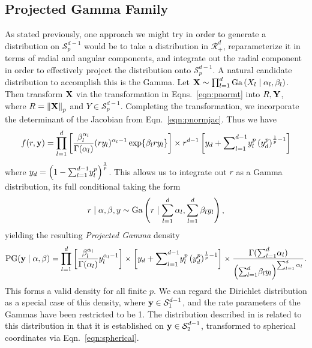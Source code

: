 \subsection{Projected Gamma Family}
As stated previously, one approach we might try in order to generate a distribution on
  $\mathcal{S}_{p}^{d-1}$ would be to take a distribution in $\mathcal{R}_{+}^d$, reparameterize
  it in terms of radial and angular components, and integrate out the radial component in order to
  effectively project the distribution onto $\mathcal{S}_{p}^{d-1}$.  A natural candidate distribution
  to accomplish this is the Gamma.  Let ${\bf X} \sim \prod_{l = 1}^d\text{Ga}\left(X_l\mid\alpha_l,\beta_l\right)$.
  Then transform ${\bf X}$ via the transformation in Eqns.~\ref{eqn:pnormt} into $R,{\bf Y}$, where
  $R = \left\lVert {\bf X} \right\rVert_{p}$ and $Y\in \mathcal{S}_{p}^{d-1}$.  Completing the transformation, we
  incorporate the determinant of the Jacobian from Eqn.~\ref{eqn:pnormjac}.  Thus we have
  \begin{equation}
    \label{eqn:protopg}
    f(r,{\bf y}) = \prod_{l = 1}^{d}
      \left[\frac{\beta_l^{\alpha_l}}{\Gamma(\alpha_l)}(ry_l)^{\alpha_l - 1}\exp\lbrace \beta_lry_l\rbrace\right]
      \times r^{d-1}\left[y_d + {\small \sum}_{l = 1}^{d-1}y_l^p\left(y_d^p\right)^{\frac{1}{p} - 1}\right]
  \end{equation}
  where $y_d = \left(1 - {\small \sum}_{l = 1}^{d-1}y_l^p\right)^{\frac{1}{p}}$.  This allows us to
  integrate out $r$ as a Gamma distribution, its full conditional taking the form
  \begin{equation}
    \label{eqn:rfullcond}
    r\mid{\bf \alpha},{\bf \beta}, y \sim \text{Ga}\left(r\mid\sum_{l = 1}^d \alpha_l, \sum_{l = 1}^d \beta_ly_l\right),
  \end{equation}
  yielding the resulting \emph{Projected Gamma} density
  \begin{equation}
    \label{eqn:projgamma}
    \text{PG}({\bf y}\mid{\bf \alpha},{\bf \beta}) = \prod_{l = 1}^d\left[\frac{\beta_l^{\alpha_l}}{\Gamma(\alpha_l)}y_l^{\alpha_l - 1}\right]
      \times \left[y_d + {\small \sum}_{l = 1}^{d-1}y_l^p\left(y_d^p\right)^{\frac{1}{p} - 1}\right]
      \times \frac{\Gamma({\small\sum}_{l = 1}^d\alpha_l)}{\left({\small\sum}_{l = 1}^d \beta_ly_l\right)^{{\small\sum_{l = 1}^d \alpha_l}}}.
  \end{equation}
  This forms a valid density for all finite $p$.  We can regard the Dirichlet distribution as a
  special case of this density, where ${\bf y}\in \mathcal{S}_1^{d-1}$, and the rate parameters of
  the Gammas have been restricted to be 1.  The distribution described in \cite{nunez2019} is related
  to this distribution in that it is established on ${\bf y}\in \mathcal{S}_2^{d-1}$, transformed to
  spherical coordinates via Eqn.~\ref{eqn:spherical}.

